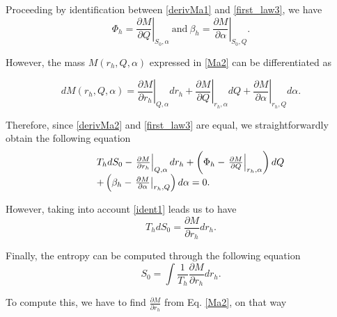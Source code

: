 \documentclass[10pt,letterpaper]{article}
\begin{document}
Proceeding by identification between \eqref{derivMa1} and \eqref{first_law3}, we have
\begin{equation}\label{ident1}
\Phi_h=\left.\frac{\partial M}{\partial Q}\right|_{S_0,\alpha} \ \text{and} \ \beta_h=\left.\frac{\partial M}{\partial \alpha}\right|_{S_0,Q}.
\end{equation}

However, the mass $M(r_h,Q,\alpha)$ expressed in \eqref{Ma2} can be differentiated as

\begin{equation}\label{derivMa2}
dM(r_h,Q,\alpha)=\left.\frac{\partial M}{\partial r_h}\right|_{Q,\alpha}dr_h+\left.\frac{\partial M}{\partial Q}\right|_{r_h,\alpha}dQ+\left.\frac{\partial M}{\partial \alpha}\right|_{r_h,Q}d\alpha.
\end{equation}

Therefore, since \eqref{derivMa2} and \eqref{first_law3} are equal, we straightforwardly obtain the following equation
\begin{equation}\label{22}
\begin{array}{r c l}
&&T_hdS_0-\left.\frac{\partial M}{\partial r_h}\right|_{Q,\alpha}dr_h+\left(\Phi_h-\left.\frac{\partial M}{\partial Q}\right|_{r_h,\alpha}\right)dQ\\
&&+\left(\beta_h-\left.\frac{\partial M}{\partial \alpha}\right|_{r_h,Q}\right)d\alpha=0.
\end{array}
\end{equation}


However, taking into account \eqref{ident1} leads us to have
\begin{equation}
T_hdS_0=\frac{\partial M}{\partial r_h}dr_h.
\end{equation}

Finally, the entropy can be computed through the following equation\cite{nam2018on,nam2018non}
\begin{equation}\label{entro}
S_0=\int\frac{1}{T_h}\frac{\partial M}{\partial r_h}dr_h.
\end{equation}

To compute this, we have to find $\frac{\partial M}{\partial r_h}$ from Eq. \eqref{Ma2}, on that way
\end{document}
